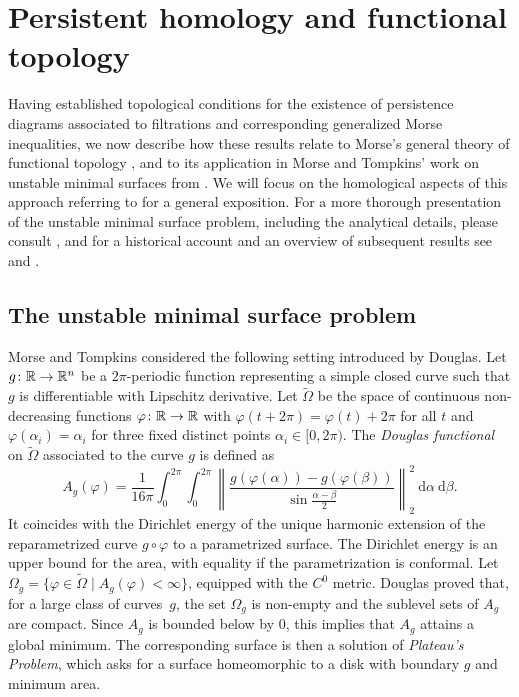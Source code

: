 
\section{Persistent homology and functional topology} \label{s:surfaces}

Having established topological conditions for the existence of persistence diagrams associated to filtrations and corresponding generalized Morse inequalities, we now describe how these results relate to Morse's general theory of functional topology \cite{Morse.1937, Morse.1938, Morse.1940}, and to its application in Morse and Tompkins' work on unstable minimal surfaces from \cite{Morse.1939}.
We will focus on the homological aspects of this approach referring to \cite[Sections 4.3--5]{Bott.1980} for a general exposition.
For a more thorough presentation of the unstable minimal surface problem, including the analytical details, please consult \cite[Section II.6]{Struwe.1988}, and for a historical account and an overview of subsequent results see \cite[Section 6]{Dierkes.2010} and \cite[Section 6.8.1]{Dierkes.2010b}.

\subsection{The unstable minimal surface problem}

Morse and Tompkins considered the following setting introduced by Douglas.
Let $g \colon \mathbb{R} \to \mathbb{R}^n$ be a $2\pi$-periodic function representing a simple closed curve such that $g$ is differentiable with Lipschitz derivative.
Let $\widetilde{\Omega}$ be the space of continuous non-decreasing functions $\varphi \colon \mathbb{R} \to \mathbb{R}$ with $\varphi(t+2\pi) = \varphi(t) + 2\pi$ for all $t$ and $\varphi(\alpha_i)=\alpha_i$ for three fixed distinct points $\alpha_i \in [0,2\pi)$.
The \emph{Douglas functional} on $\widetilde \Omega$ associated to the curve $g$ is defined as
\begin{equation*}
A_g(\varphi) = \frac{1}{16 \pi} \int_0^{2\pi} \int_0^{2\pi}  \left\| \frac{g(\varphi(\alpha)) - g(\varphi(\beta))}{\sin \frac{\alpha-\beta}{2}} \right\|_2^2 \ \mathrm{d}\alpha \ \mathrm{d}\beta.
\end{equation*}
It coincides with the Dirichlet energy of the unique harmonic extension of the reparametrized curve $g \circ \varphi$ to a parametrized surface.
The Dirichlet energy is an upper bound for the area, with equality if the parametrization is conformal.
Let $\Omega_g = \{\varphi \in \widetilde\Omega \mid A_g(\varphi) < \infty\}$, equipped with the $C^0$ metric.
Douglas proved that, for a large class of curves~$g$, the set $\Omega_g$ is non-empty and the sublevel sets of $A_g$ are compact.
Since $A_g$ is bounded below by $0$, this implies that $A_g$ attains a global minimum.
The corresponding surface is then a solution of \emph{Plateau's Problem}, which asks for a surface homeomorphic to a disk with boundary $g$ and minimum area.

